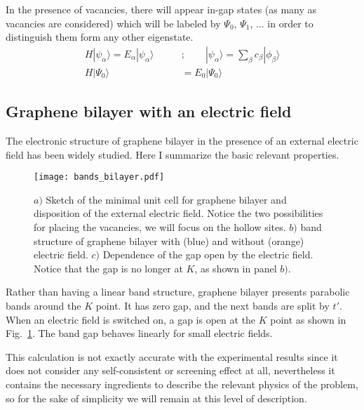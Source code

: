 \documentclass[a4paper]{article}
\newcommand{\ket}[1]{|#1\rangle}
\begin{document}
In the presence of vacancies, there will appear in-gap states (as many as vacancies are considered) which will be labeled by $\Psi_0$, $\Psi_1$, ... in order to distinguish them form any other eigenstate.
\begin{equation}
\begin{split}
  H\ket{\psi_\alpha} = E_\alpha\ket{\psi_\alpha} \qquad&;\qquad
\ket{\psi_\alpha} = \sum_\beta c_\beta\ket{\phi_\beta}\\
  H\ket{\Psi_0} &= E_0\ket{\Psi_0}
\end{split}
\end{equation}

\subsection{Graphene bilayer with an electric field}
The electronic structure of graphene bilayer in the presence of an external electric field has been widely studied. Here I summarize the basic relevant properties.\\
\begin{figure}[!ht!]
\centering
\texttt{[image: bands\_bilayer.pdf]}
\vspace{-5pt}
\caption{$a)$ Sketch of the minimal unit cell for graphene bilayer and disposition of the external electric field. Notice the two possibilities for placing the vacancies, we will focus on the hollow sites. $b)$ band structure of graphene bilayer with (blue) and without (orange) electric field. $c)$ Dependence of the gap open by the electric field. Notice that the gap is no longer at $K$, as shown in panel $b)$.}
\label{bilayer2d}
\end{figure}
Rather than having a linear band structure, graphene bilayer presents parabolic bands around the $K$ point. It has zero gap, and the next bands are split by $t'$. When an electric field is switched on, a gap is open at the $K$ point as shown in Fig.~\ref{bilayer2d}. The band gap behaves linearly for small electric fields.

This calculation is not exactly accurate with the experimental results\cite{Zhang2009} since it does not consider any self-consistent or screening effect at all, nevertheless it contains the necessary ingredients to describe the relevant physics of the problem, so for the sake of simplicity we will remain at this level of description.
\end{document}
